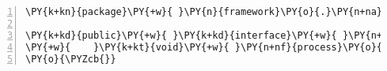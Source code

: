 \begin{Verbatim}[commandchars=\\\{\},numbers=left,firstnumber=1,stepnumber=1,frame=single,fontsize=\small]
\PY{k+kn}{package}\PY{+w}{ }\PY{n}{framework}\PY{o}{.}\PY{n+na}{process}\PY{o}{;}

\PY{k+kd}{public}\PY{+w}{ }\PY{k+kd}{interface}\PY{+w}{ }\PY{n+nc}{Process}\PY{+w}{ }\PY{o}{\PYZob{}}
\PY{+w}{    }\PY{k+kt}{void}\PY{+w}{ }\PY{n+nf}{process}\PY{o}{(}\PY{n}{Input}\PY{+w}{ }\PY{n}{input}\PY{o}{,}\PY{+w}{ }\PY{n}{Output}\PY{+w}{ }\PY{n}{output}\PY{o}{)}\PY{o}{;}
\PY{o}{\PYZcb{}}
\end{Verbatim}
